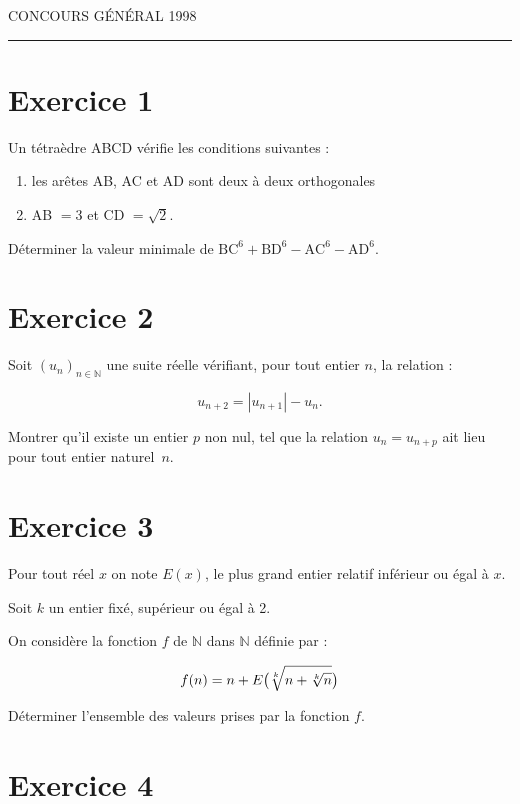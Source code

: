 \documentclass[12pt,a4paper]{article}
\begin{document}

\begin{center}\Large \color{red}
\sc CONCOURS GÉNÉRAL 1998\\
\rule{10cm}{1mm}
\end{center}

\section*{\color{blue} Exercice 1}

Un tétraèdre ABCD vérifie les conditions suivantes :

\begin{enumerate}
\item les arêtes AB, AC et AD sont deux  à deux orthogonales
\item AB $= 3$ et CD $=\sqrt{2}$.
\end{enumerate}

Déterminer la valeur minimale de $\text{BC}^6 + \text{BD}^6 - \text{AC}^6 - \text{AD}^6$.

\section*{\color{blue} Exercice 2}

Soit $\left(u_n\right)_{n\in \mathbb{N}}$ une suite réelle vérifiant, pour tout
entier $n$, la relation :

\[u_{n+2}= \left|u_{n+1}\right|-u_n.\]

Montrer qu'il existe un entier $p$ non nul,
tel que la relation $u_n= u_{n+p}$ ait lieu pour tout entier naturel~$n$.

\section*{\color{blue} Exercice 3}

Pour tout réel $x$ on note $E(x)$, le plus grand entier
relatif inférieur ou égal à $x$. 

Soit $k$ un entier fixé, supérieur ou égal à 2. 

On considère la fonction $f$ de $\mathbb{N}$ dans $\mathbb{N}$ définie par :

\[f(n)=n+E\big(\root k\of{n+\root k\of{n}}\big)\]

Déterminer l'ensemble des valeurs prises par la fonction $f$.

\section*{\color{blue} Exercice 4}
\end{document}
